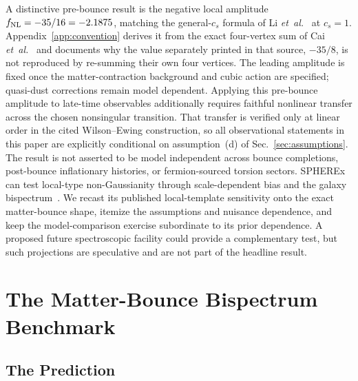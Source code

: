 \documentclass[aps,prd,twocolumn,superscriptaddress,showpacs,preprintnumbers,nofootinbib,longbibliography,floatfix]{revtex4-2}
\newcommand{\fnl}{f_{\rm NL}}
\newcommand{\etal}{\textit{et~al.}}
\begin{document}
A distinctive pre-bounce result is the negative local amplitude $\fnl=-35/16=-2.1875$, matching the general-$c_s$ formula of Li \etal~\cite{LiQuintin:2017} at $c_s=1$. Appendix~\ref{app:convention} derives it from the exact four-vertex sum of Cai \etal~\cite{Cai:2009fn} and documents why the value separately printed in that source, $-35/8$, is not reproduced by re-summing their own four vertices. The leading amplitude is fixed once the matter-contraction background and cubic action are specified; quasi-dust corrections remain model dependent. Applying this pre-bounce amplitude to late-time observables additionally requires faithful nonlinear transfer across the chosen nonsingular transition. That transfer is verified only at linear order in the cited Wilson--Ewing construction, so all observational statements in this paper are explicitly conditional on assumption~(d) of Sec.~\ref{sec:assumptions}. The result is not asserted to be model independent across bounce completions, post-bounce inflationary histories, or fermion-sourced torsion sectors.
SPHEREx~\cite{Dore:2014} can test local-type non-Gaussianity through scale-dependent bias and the galaxy bispectrum~\cite{Dalal:2007cu,Heinrich:2023}. We recast its published local-template sensitivity onto the exact matter-bounce shape, itemize the assumptions and nuisance dependence, and keep the model-comparison exercise subordinate to its prior dependence. A proposed future spectroscopic facility could provide a complementary test, but such projections are speculative and are not part of the headline result.
\section{The Matter-Bounce Bispectrum Benchmark}
\label{sec:benchmark}

\subsection{The Prediction}
\end{document}
